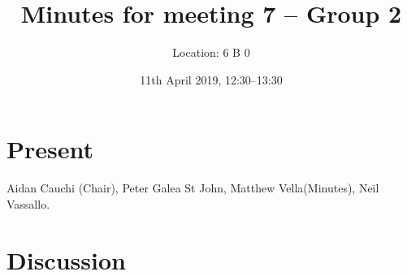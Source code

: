 \documentclass[11pt,a4paper]{article}
\title{ Minutes for meeting 7 -- Group 2}
\author{Location: 6 B 0}
\date{11th April 2019, 12:30--13:30}
\begin{document}
\maketitle

\section*{Present}
Aidan Cauchi (Chair),
Peter Galea St John,
Matthew Vella(Minutes),
Neil Vassallo.



\section*{Discussion}
\end{document}
